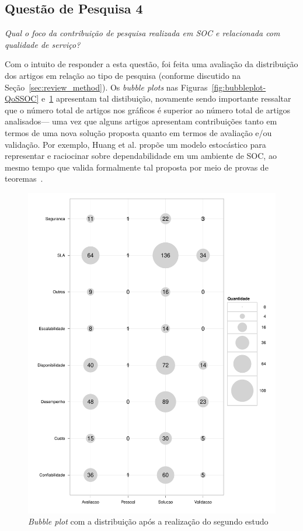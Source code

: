 \subsection{Questão de Pesquisa 4}

\emph{Qual o foco da contribuição de pesquisa realizada em SOC e relacionada com qualidade de serviço? }

Com o intuito de responder a esta questão, foi feita uma avalia\c c\~{a}o da distribui\c c\~{a}o dos 
artigos em rela\c c\~{a}o ao tipo de pesquisa (conforme discutido na Se\c c\~{a}o~\ref{sec:review_method}). 
Os \emph{bubble plots} nas Figuras~\ref{fig:bubbleplot-QoSSOC} e~\ref{fig:bubbleplot-QoSRes}  apresentam tal distibui\c c\~{a}o, novamente sendo importante 
ressaltar que o n\'{u}mero total de artigos nos gr\'{a}ficos \'{e} superior ao n\'{u}mero total de artigos analisados--- 
uma vez que alguns artigos apresentam contribui\c c\~{o}es tanto em termos de uma nova solu\c c\~{a}o proposta 
quanto em termos de avalia\c c\~{a}o e/ou valida\c c\~{a}o. Por exemplo, Huang et al. prop\~{o}e um 
modelo estoc\'{a}stico para representar e raciocinar sobre dependabilidade em um ambiente de SOC, ao mesmo tempo 
que valida formalmente tal proposta por meio de provas de teoremas~\cite{huang:scc2011}.

\begin{figure}[htb]
\centering
\includegraphics[scale=0.55]{imagens/pesquisaContexto.pdf}
\caption{\emph{Bubble plot} com a distribui\c{c}\~{a}o ap\'{o}s a realiza\c{c}\~{a}o do segundo estudo}
\label{fig:bubbleplot-QoSRes}
\end{figure}

